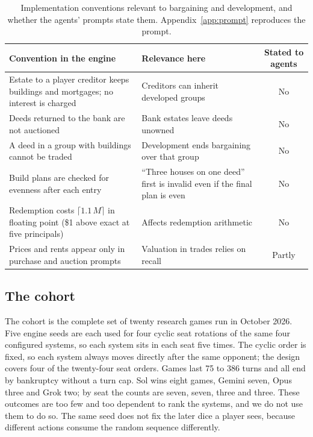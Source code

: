 \begin{table}[t]
\centering\small
\begin{tabularx}{\linewidth}{@{}YYc@{}}
\toprule
Convention in the engine & Relevance here & Stated to agents\\
\midrule
Estate to a player creditor keeps buildings and mortgages; no interest is charged & Creditors can inherit developed groups & No\\
Deeds returned to the bank are not auctioned & Bank estates leave deeds unowned & No\\
A deed in a group with buildings cannot be traded & Development ends bargaining over that group & No\\
Build plans are checked for evenness after each entry & ``Three houses on one deed'' first is invalid even if the final plan is even & No\\
Redemption costs $\lceil 1.1\,M \rceil$ in floating point (\$1 above exact at five principals) & Affects redemption arithmetic & No\\
Prices and rents appear only in purchase and auction prompts & Valuation in trades relies on recall & Partly\\
\bottomrule
\end{tabularx}
\caption{Implementation conventions relevant to bargaining and development, and whether the agents' prompts state them. Appendix~\ref{app:prompt} reproduces the prompt.}
\label{tab:rules}
\end{table}

\subsection{The cohort}

The cohort is the complete set of twenty research games run in October 2026. Five engine seeds are each used for four cyclic seat rotations of the same four configured systems, so each system sits in each seat five times. The cyclic order is fixed, so each system always moves directly after the same opponent; the design covers four of the twenty-four seat orders. Games last 75 to 386 turns and all end by bankruptcy without a turn cap. Sol wins eight games, Gemini seven, Opus three and Grok two; by seat the counts are seven, seven, three and three. These outcomes are too few and too dependent to rank the systems, and we do not use them to do so. The same seed does not fix the later dice a player sees, because different actions consume the random sequence differently.

